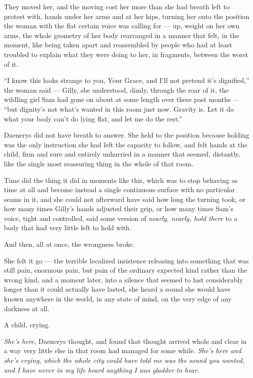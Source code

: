They moved her, and the moving cost her more than she had breath left to protest with, hands under her arms and at her hips, turning her onto the position the woman with the flat certain voice was calling for — up, weight on her own arms, the whole geometry of her body rearranged in a manner that felt, in the moment, like being taken apart and reassembled by people who had at least troubled to explain what they were doing to her, in fragments, between the worst of it.

“I know this looks strange to you, Your Grace, and I’ll not pretend it’s dignified,” the woman said — Gilly, she understood, dimly, through the roar of it, the wildling girl Sam had gone on about at some length over these past months — “but dignity’s not what’s wanted in this room just now. Gravity is. Let it do what your body can’t do lying flat, and let me do the rest.”

Daenerys did not have breath to answer. She held to the position because holding was the only instruction she had left the capacity to follow, and felt hands at the child, firm and sure and entirely unhurried in a manner that seemed, distantly, like the single most reassuring thing in the whole of that room.

\sceneBreak

Time did the thing it did in moments like this, which was to stop behaving as time at all and become instead a single continuous surface with no particular seams in it, and she could not afterward have said how long the turning took, or how many times Gilly’s hands adjusted their grip, or how many times Sam’s voice, tight and controlled, said some version of \textit{nearly, nearly, hold there} to a body that had very little left to hold with.

And then, all at once, the wrongness broke.

She felt it go — the terrible localized insistence releasing into something that was still pain, enormous pain, but pain of the ordinary expected kind rather than the wrong kind, and a moment later, into a silence that seemed to last considerably longer than it could actually have lasted, she heard a sound she would have known anywhere in the world, in any state of mind, on the very edge of any darkness at all.

A child, crying.

\sceneBreak

\textit{She’s here,} Daenerys thought, and found that thought arrived whole and clear in a way very little else in that room had managed for some while. \textit{She’s here and she’s crying, which the whole city could have told me was the sound you wanted, and I have never in my life heard anything I was gladder to hear.}

